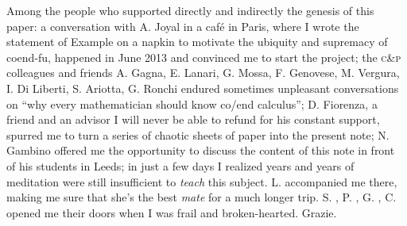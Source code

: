 Among the people who supported directly and indirectly the genesis of this paper: a conversation with {\sf A\@. Joyal} in a café in Paris, where I wrote the statement of Example  on a napkin to motivate the ubiquity and supremacy of coend\hyp{}fu, happened in June 2013 and convinced me to start the project; the \textsc{c}\&\textsc{p} colleagues and friends {\sf A\@. Gagna}, {\sf E\@. Lanari}, {\sf G\@. Mossa}, {\sf F\@. Genovese}, {\sf M\@. Vergura}, {\sf I\@. Di Liberti}, {\sf S\@. Ariotta}, {\sf G\@. Ronchi} endured sometimes unpleasant conversations on ``why every mathematician should know co/end calculus'';  {\sf D\@. Fiorenza}, a friend and an advisor I will never be able to refund for his constant support, spurred me to turn a series of chaotic sheets of paper into the present note; {\sf N\@. Gambino} offered me the opportunity to discuss the content of this note in front of his students in Leeds; in just a few days I realized years and years of meditation were still insufficient to \emph{teach} this subject. L\@. accompanied me there, making me sure that she's the best \emph{mate} for a much longer trip. 
\textsf{S\@.}%
, \textsf{P\@.}%
, \textsf{G\@.}%
, \textsf{C\@.} %
opened me their doors when I was frail and broken\hyp{}hearted. Grazie.